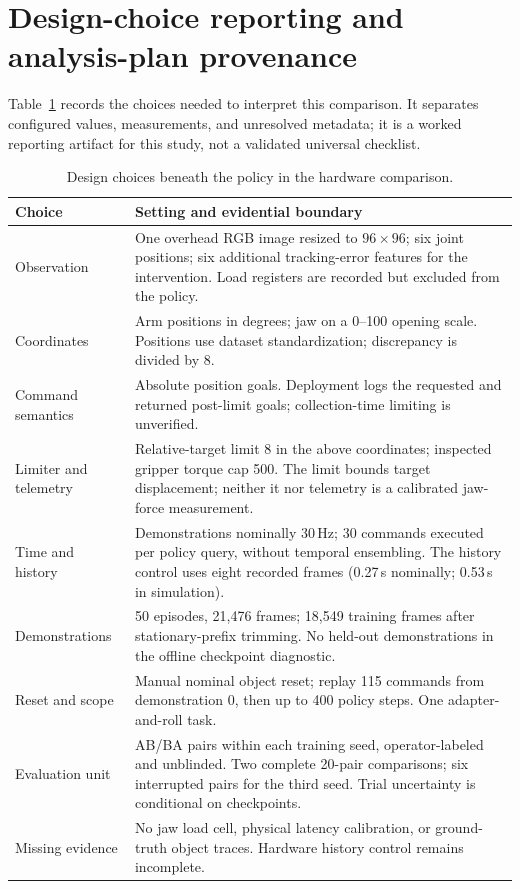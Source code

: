 \documentclass{article}
\begin{document}
\section{Design-choice reporting and analysis-plan provenance}
\label{app:reporting}
Table~\ref{tab:design-report} records the choices needed to interpret this
comparison. It separates configured values, measurements, and unresolved
metadata; it is a worked reporting artifact for this study, not a validated
universal checklist.

\begin{table}[h]
\centering
\small
\caption{Design choices beneath the policy in the hardware comparison.}
\label{tab:design-report}
\begin{tabular}{p{.22\linewidth}p{.71\linewidth}}
\toprule
Choice & Setting and evidential boundary \\
\midrule
Observation & One overhead RGB image resized to $96\times96$; six joint
positions; six additional tracking-error features for the intervention.
Load registers are recorded but excluded from the policy. \\
Coordinates & Arm positions in degrees; jaw on a 0--100 opening scale.
Positions use dataset standardization; discrepancy is divided by 8. \\
Command semantics & Absolute position goals. Deployment logs the requested
and returned post-limit goals; collection-time limiting is unverified. \\
Limiter and telemetry & Relative-target limit 8 in the above coordinates;
inspected gripper torque cap 500. The limit bounds target displacement;
neither it nor telemetry is a calibrated jaw-force measurement. \\
Time and history & Demonstrations nominally 30\,Hz; 30 commands executed per
policy query, without temporal ensembling. The history control uses eight
recorded frames (0.27\,s nominally; 0.53\,s in simulation). \\
Demonstrations & 50 episodes, 21,476 frames; 18,549 training frames after
stationary-prefix trimming. No held-out demonstrations in the offline
checkpoint diagnostic. \\
Reset and scope & Manual nominal object reset; replay 115 commands from
demonstration 0, then up to 400 policy steps. One adapter-and-roll task. \\
Evaluation unit & AB/BA pairs within each training seed, operator-labeled
and unblinded. Two complete 20-pair comparisons; six interrupted pairs
for the third seed. Trial uncertainty is conditional on checkpoints. \\
Missing evidence & No jaw load cell, physical latency calibration, or
ground-truth object traces. Hardware history control remains incomplete. \\
\bottomrule
\end{tabular}
\end{table}
\end{document}
